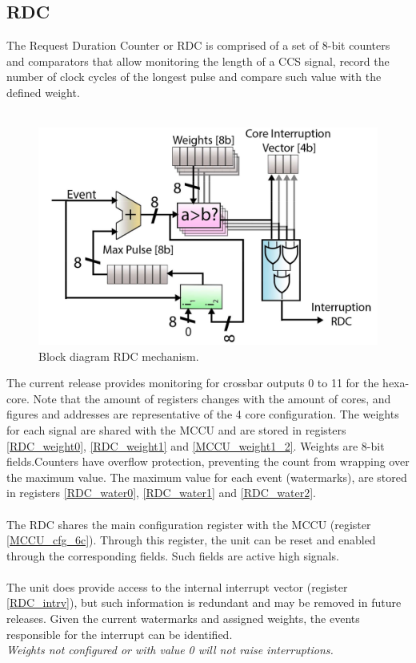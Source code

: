 \subsection{RDC}
The Request Duration Counter or RDC is comprised of a set of 8-bit counters and comparators that allow monitoring the length of a CCS signal, record the number of clock cycles of the longest pulse and compare such value with the defined weight.\\
\\
\begin{figure}[H]
	\begin{center}
	\includegraphics[keepaspectratio,scale=0.15]{img/bd_RDC.png}
	\caption{Block diagram RDC mechanism.}
	\label{fig:blk_RDC}
	\end{center}
\end{figure}

The current release provides monitoring for crossbar outputs 0 to 11 for the hexa-core. Note that the amount of registers changes with the amount of cores, and figures and addresses are representative of the 4 core configuration. The weights for each signal are shared with the MCCU and are stored in registers \ref{RDC_weight0}, \ref{RDC_weight1} and \ref{MCCU_weight1_2}. Weights are 8-bit fields.Counters have overflow protection, preventing the count from wrapping over the maximum value.  The maximum value for each event (watermarks), are stored in registers \ref{RDC_water0}, \ref{RDC_water1} and \ref{RDC_water2}.\\
\\
The RDC shares the main configuration register with the MCCU (register \ref{MCCU_cfg_6c}). Through this register, the unit can be reset and enabled through the corresponding fields. Such fields are active high signals. \\
\\
The unit does provide access to the internal interrupt vector (register \ref{RDC_intrv}), but such information is redundant and may be removed in future releases. Given the current watermarks and assigned weights, the events responsible for the interrupt can be identified. 
\\
\textit{Weights not configured or with value 0 will not raise interruptions.}


